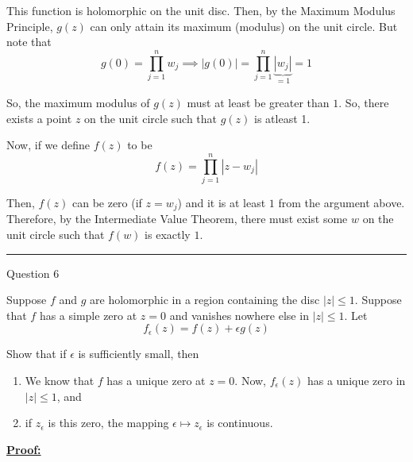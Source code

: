 \documentclass{article}
\begin{document}
This function is holomorphic on the unit disc. Then, by the Maximum Modulus Principle, $g(z)$ can only attain its maximum (modulus) on the unit circle. But note that 
\[ g(0) = \prod_{j = 1}^{n} w_j \implies \left| g(0) \right| = \prod_{j = 1}^{n} \underbrace{|w_j|}_{=1} = 1 \]

So, the maximum modulus of $g(z)$ must at least be greater than $1$. So, there exists a point $z$ on the unit circle such that $g(z)$ is atleast 1.

Now, if we define $f(z)$ to be 
\[ f(z) = \prod_{j = 1}^{n} |z - w_j| \]

Then, $f(z)$ can be zero (if $z = w_j$) and it is at least $1$ from the argument above. Therefore, by the Intermediate Value Theorem, there must exist some $w$ on the unit circle such that $f(w)$ is exactly $1$.

\vskip 0.5cm
\hrule 
\vskip 0.5cm



\begin{mathdefinitionbox}{Question 6}

\vskip 0.5cm
Suppose $f$ and $g$ are holomorphic in a region containing the disc $|z| \leq 1$. Suppose that $f$ has a simple zero at $z = 0$ and vanishes nowhere else in $|z| \leq 1$. Let 
\[ f_{\epsilon}(z) = f(z) + \epsilon g(z) \] 

Show that if $\epsilon$ is sufficiently small, then 
\begin{enumerate}[label=(\alph*)]
  \item We know that $f$ has a unique zero at $z = 0$. Now, $f_{\epsilon}(z)$ has a unique zero in $|z| \leq 1$, and 
  \item if $z_{\epsilon}$ is this zero, the mapping $\epsilon \mapsto z_{\epsilon}$ is continuous.
\end{enumerate}

\end{mathdefinitionbox}

\vskip 0.5cm
\underline{\textbf{Proof:}}
\end{document}
